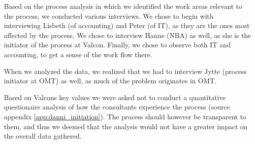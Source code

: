 Based on the process analysis in which we identified the work areas relevant to the process, we conducted various interviews.
We chose to begin with interviewing Lisbeth (of accounting) and Peter (of IT), as they are the ones most affected by the process.
We chose to interview Hanne (NBA) as well, as she is the initiator of the process at Valcon.
Finally, we chose to observe both IT and accounting, to get a sense of the work flow there.

When we analyzed the data, we realized that we had to interview Jytte (process initiator at OMT) as well, as much of the problem originates in OMT.

Based on Valcons key values we were asked not to conduct a quantitative questionaire analysis of how the consultants experience the process (source appendix \ref{app:danni_initiation}). The process should however be transparent to them, and thus we deemed that the analysis would not have a greater impact on the overall data gathered.

